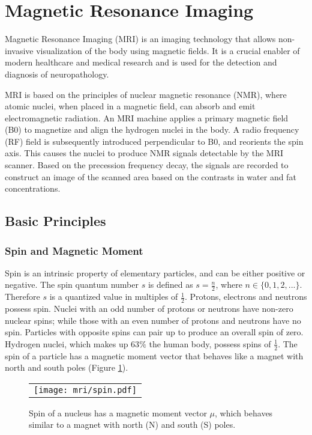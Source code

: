 \section{Magnetic Resonance Imaging}
Magnetic Resonance Imaging (MRI) is an imaging technology that allows non-invasive visualization of the body using magnetic fields. It is a crucial enabler of modern healthcare and medical research and is used for the detection and diagnosis of neuropathology.

MRI is based on the principles of nuclear magnetic resonance (NMR), where atomic nuclei, when placed in a magnetic field, can absorb and emit electromagnetic radiation. An MRI machine applies a primary magnetic field (B0) to magnetize and align the hydrogen nuclei in the body. A radio frequency (RF) field is subsequently introduced perpendicular to B0, and reorients the spin axis. This causes the nuclei to produce NMR signals detectable by the MRI scanner. Based on the precession frequency decay, the signals are recorded to construct an image of the scanned area based on the contrasts in water and fat concentrations. 

\subsection{Basic Principles}
\subsubsection{Spin and Magnetic Moment}
Spin is an intrinsic property of elementary particles, and can be either positive or negative. The spin quantum number  $s$ is defined as $ s = \frac{n}{2}$, where $n \in \{0,1,2,...\}$. Therefore $s$ is a quantized value in multiples of $\frac{1}{2}$. Protons, electrons and neutrons possess spin. Nuclei with an odd number of protons or neutrons have non-zero nuclear spins; while those with an even number of protons and neutrons have no spin. Particles with opposite spins can pair up to produce an overall spin of zero. Hydrogen nuclei, which makes up 63$\%$ the human body, possess spins of $\frac{1}{2}$. The spin of a particle has a magnetic moment vector that behaves like a magnet with north and south poles (Figure \ref{fig:spin}).


\begin{figure}[ht]
\begin{center}
\begin{tabular}{c}
\texttt{[image: mri/spin.pdf]}
\end{tabular}
\caption{Spin of a nucleus has a magnetic moment vector $\mu$, which behaves similar to a magnet with north (N) and south (S) poles.}
\label{fig:spin}
\end{center}
\end{figure}

